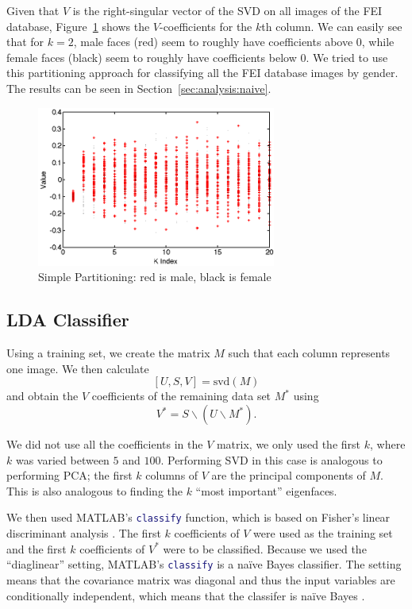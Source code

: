 \documentclass[hidelinks,11pt]{article}
\begin{document}
Given that $V$ is the right-singular vector of the SVD on all images of the FEI
database, Figure~\ref{fig:model:naive:part} shows the $V$-coefficients for the
$k$th column. We can easily see that for $k = 2$, male faces (red) seem to
roughly have coefficients above 0, while female faces (black) seem to roughly
have coefficients below 0. We tried to use this partitioning approach for
classifying all the FEI database images by gender. The results can be seen in
Section~\ref{sec:analysis:naive}.

\begin{figure}[!ht]
  \centering
  \includegraphics[width=0.7\textwidth]{naive_classifier_k_partition.png}
  \caption{Simple Partitioning: red is male, black is female}
  \label{fig:model:naive:part}
\end{figure}

\pagebreak
\subsection{LDA Classifier} 
\label{sec:model:lda}

Using a training set, we create the matrix $M$ such that each column represents
one image. We then calculate
\[ \left[ U, S, V \right] = \mathrm{svd}(M) \]
and obtain the $V$ coefficients of the remaining data set $M^*$ using
\[ V^* = S \backslash (U \backslash M^*). \]

We did not use all the coefficients in the $V$ matrix, we only used the first
$k$, where $k$ was varied between $5$ and $100$. Performing SVD in this case is
analogous to performing PCA; the first $k$ columns of $V$ are the principal
components of $M$. This is also analogous to finding the $k$ ``most important''
eigenfaces.

We then used MATLAB's \lstinline[language=Matlab]!classify! function, which is
based on Fisher's linear discriminant analysis \cite{classify}. The first $k$
coefficients of $V$ were used as the training set and the first $k$ coefficients
of $V^*$ were to be classified. Because we used the ``diaglinear'' setting,
MATLAB's \lstinline[language=Matlab]!classify! is a na\"ive Bayes classifier.
The setting means that the covariance matrix was diagonal and thus the input
variables are conditionally independent, which means that the classifer is
na\"ive Bayes \cite{nbayes}.
\end{document}
